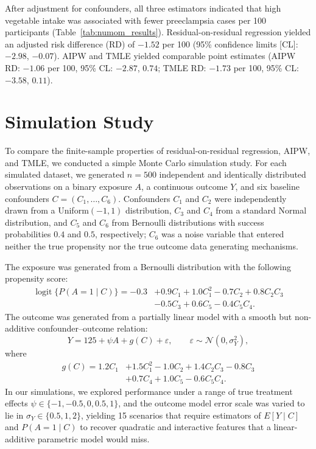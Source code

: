 \documentclass[12pt]{article}
\DeclareMathOperator{\logit}{logit}
\begin{document}
After adjustment for confounders, all three estimators indicated that high vegetable intake was associated with fewer preeclampsia cases per 100 participants (Table~\ref{tab:numom_results}). Residual-on-residual regression yielded an adjusted risk difference (RD) of $-1.52$ per 100 (95\% confidence limits [CL]: $-2.98$, $-0.07$). AIPW and TMLE yielded comparable point estimates (AIPW RD: $-1.06$ per 100, 95\% CL: $-2.87$, $0.74$; TMLE RD: $-1.73$ per 100, 95\% CL: $-3.58$, $0.11$).

\section{Simulation Study}

To compare the finite-sample properties of residual-on-residual regression, AIPW, and TMLE, we conducted a simple Monte Carlo simulation study. For each simulated dataset, we generated $n = 500$ independent and identically distributed observations on a binary exposure $A$, a continuous outcome $Y$, and six baseline confounders $C = (C_1, \ldots, C_6)$. Confounders $C_1$ and $C_2$ were independently drawn from a Uniform$(-1, 1)$ distribution, $C_3$ and $C_4$ from a standard Normal distribution, and $C_5$ and $C_6$ from Bernoulli distributions with success probabilities $0.4$ and $0.5$, respectively; $C_6$ was a noise variable that entered neither the true propensity nor the true outcome data generating mechanisms.

The exposure was generated from a Bernoulli distribution with the following propensity score:
\begin{align*}
\logit\{P(A = 1 \mid C)\} = -0.3 &+ 0.9 C_1 + 1.0 C_1^2 - 0.7 C_2 + 0.8 C_2 C_3 \\
& - 0.5 C_3 + 0.6 C_5 - 0.4 C_5 C_4.
\end{align*}
The outcome was generated from a partially linear model with a smooth but non-additive confounder--outcome relation:
$$Y = 125 + \psi A + g(C) + \varepsilon, \qquad \varepsilon \sim \mathcal{N}(0, \sigma_Y^2),$$
where
\begin{align*}
g(C) = 1.2 C_1 &+ 1.5 C_1^2 - 1.0 C_2 + 1.4 C_2 C_3 - 0.8 C_3 \\
& + 0.7 C_4 + 1.0 C_5 - 0.6 C_5 C_4.
\end{align*}
In our simulations, we explored performance under a range of true treatment effects $\psi \in \{-1, -0.5, 0, 0.5, 1\}$, and the outcome model error scale was varied to lie in $\sigma_Y \in \{0.5, 1, 2\}$, yielding 15 scenarios that require estimators of $E[Y \mid C]$ and $P(A = 1 \mid C)$ to recover quadratic and interactive features that a linear-additive parametric model would miss.
\end{document}
